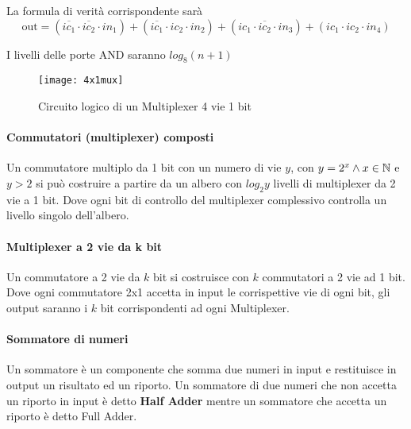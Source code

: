 La formula di verità corrispondente sarà
\[ \text{out} = (\overbar{ic_1} \cdot \overbar{ic_2} \cdot in_1) + (\overbar{ic_1} \cdot ic_2 \cdot in_2) + (ic_1 \cdot \overbar{ic_2} \cdot in_3) + (ic_1\cdot ic_2 \cdot in_4)  \]

I livelli delle porte AND saranno $ log_8(n+1) $

\begin{figure}[H]
	\centering
	\texttt{[image: 4x1mux]}
	\caption{Circuito logico di un Multiplexer 4 vie 1 bit}
\end{figure}

\paragraph{Commutatori (multiplexer) composti}
Un commutatore multiplo da 1 bit con un numero di vie $ y $, con $ y = 2^x \land x \in \mathbb{N} $ e $ y > 2 $ si può costruire a partire da un albero con $ log_2y $ livelli di multiplexer da 2 vie a 1 bit. Dove ogni bit di controllo del multiplexer complessivo controlla un livello singolo dell'albero.


\paragraph{Multiplexer a 2 vie da k bit}

Un commutatore a 2 vie da $ k $ bit si costruisce con $ k $ commutatori a 2 vie ad 1 bit. Dove ogni commutatore 2x1 accetta in input le corrispettive vie di ogni bit, gli output saranno i $ k $ bit corrispondenti ad ogni Multiplexer.



\paragraph{Sommatore di numeri}
Un sommatore è un componente che somma due numeri in input e restituisce in output un risultato ed un riporto.
Un sommatore di due numeri che non accetta un riporto in input è detto \textbf{Half Adder} mentre un sommatore che accetta un riporto è detto Full Adder.

